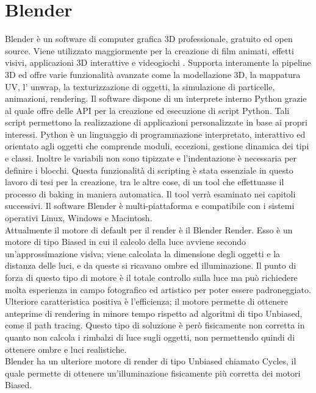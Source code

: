 \section{Blender}
\label{sec:chapter_tecnologie_abilitanti_blender}

Blender è un software di computer grafica 3D professionale, gratuito ed open source. 
Viene utilizzato maggiormente per la creazione di film animati, effetti visivi, applicazioni 3D interattive e videogiochi \cite{blender} . 
Supporta interamente la pipeline 3D ed offre varie funzionalità avanzate come la modellazione 3D, la mappatura UV, l’ unwrap, la texturizzazione di oggetti, la simulazione di particelle, animazioni, rendering.
Il software dispone di un interprete interno Python grazie al quale offre delle API per la creazione ed esecuzione di script Python. 
Tali script permettono la realizzazione di applicazioni personalizzate in base ai propri interessi.
Python è un linguaggio di programmazione interpretato, interattivo ed orientato agli oggetti che comprende moduli, eccezioni, gestione dinamica dei tipi e classi. Inoltre le variabili non sono tipizzate e l’indentazione è necessaria per definire i blocchi.
Questa funzionalità di scripting è stata essenziale in questo lavoro di tesi per la creazione, tra le altre cose, di un tool che effettuasse il processo di baking in maniera automatica. Il tool verrà esaminato nei capitoli successivi.
Il software Blender è multi-piattaforma e compatibile con i sistemi operativi Linux, Windows e Macintosh.
\\
Attualmente il motore di default per il render è il Blender Render. Esso è un motore di tipo Biased in cui il calcolo della luce avviene secondo un’approssimazione visiva; viene calcolata la dimensione degli oggetti e la distanza delle luci, e da queste si ricavano ombre ed illuminazione.
Il punto di forza di questo tipo di motore è il totale controllo sulla luce ma può richiedere molta esperienza in campo fotografico ed artistico per poter essere padroneggiato. Ulteriore caratteristica positiva è l’efficienza; il motore permette di ottenere anteprime di rendering in minore tempo rispetto ad algoritmi di tipo Unbiased, come il path tracing.
Questo tipo di soluzione è però fisicamente non corretta in quanto non calcola i rimbalzi di luce sugli oggetti, non permettendo quindi di ottenere ombre e luci realistiche.
\\
Blender ha un ulteriore motore di render di tipo Unbiased chiamato Cycles, il quale permette di ottenere un’illuminazione fisicamente più corretta dei motori Biased.
